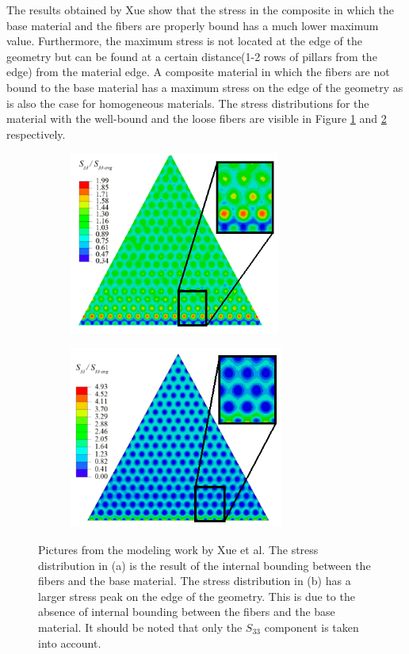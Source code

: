 \qquad The results obtained by Xue show that the stress in the composite in which the base material and the fibers are properly bound has a much lower maximum value. Furthermore, the maximum stress is not located at the edge of the geometry but can be found at a certain distance(1-2 rows of pillars from the edge) from the material edge. A composite material in which the fibers are not bound to the base material has a maximum stress on the edge of the geometry as is also the case for homogeneous materials. The stress distributions for the material with the well-bound and the loose fibers are visible in Figure \ref{fig:Xue_model_1} and \ref{fig:Xue_model_2} respectively.\\ 

\begin{figure}[h!] 
    \begin{subfigure}{0.49\textwidth}
    \includegraphics[width=\linewidth, height=6cm, angle=0]{images/Xue_work/Xue_model_internal_bounding.png}
    \caption{}
    \label{fig:Xue_model_1}
    \end{subfigure}
        \hfill
    \begin{subfigure}{0.49\textwidth}
    \includegraphics[width=\linewidth, height=6cm, angle=0]{images/Xue_work/Xue_model_internal_loose.png}
    \caption{}
    \label{fig:Xue_model_2}
    \end{subfigure}
    \caption{Pictures from the modeling work by Xue et al. The stress distribution in (a) is the result of the internal bounding between the fibers and the base material. The stress distribution in (b) has a larger stress peak on the edge of the geometry. This is due to the absence of internal bounding between the fibers and the base material. It should be noted that only the $S_{33}$ component is taken into account.}
    \label{fig:all_images_Xue}
\end{figure}

